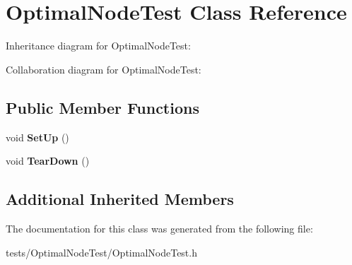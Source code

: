\hypertarget{classOptimalListTest}{}\section{Optimal\+Node\+Test Class Reference}
\label{classOptimalListTest}


Inheritance diagram for Optimal\+Node\+Test\+:


Collaboration diagram for Optimal\+Node\+Test\+:
\subsection*{Public Member Functions}
\begin{DoxyCompactItemize}
\item 
\mbox{\label{classOptimalListTest_a3ba42fe349963e5bd712d6a7b4a946e1}} 
void {\bfseries Set\+Up} ()
\item 
\mbox{\label{classOptimalListTest_a22133de719fbfc30ffbcf11e85d8c712}} 
void {\bfseries Tear\+Down} ()
\end{DoxyCompactItemize}
\subsection*{Additional Inherited Members}


The documentation for this class was generated from the following file\+:\begin{DoxyCompactItemize}
\item 
tests/\+Optimal\+Node\+Test/Optimal\+Node\+Test.\+h\end{DoxyCompactItemize}
